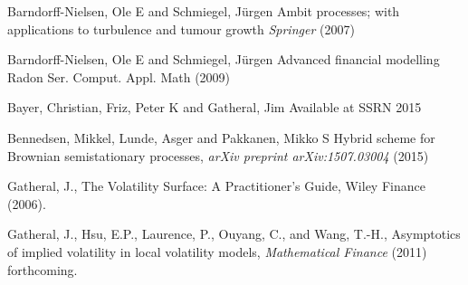 \documentclass[12pt]{article}
\numberwithin{equation}{section}
\begin{document}
%
%
%
%

\begin{thebibliography}{}

{Barndorff-Nielsen, Ole E} and {Schmiegel, J{\"u}rgen}
{Ambit processes; with applications to turbulence and tumour growth}
{\it Springer} (2007)

{Barndorff-Nielsen, Ole E} and {Schmiegel, J{\"u}rgen}
{Advanced financial modelling}
{Radon Ser. Comput. Appl. Math} (2009)

{Bayer, Christian}, {Friz, Peter K} and {Gatheral, Jim}
{Available at SSRN}
{2015}

{Bennedsen, Mikkel}, {Lunde, Asger} and {Pakkanen, Mikko S}
{Hybrid scheme for Brownian semistationary processes},
{\it arXiv preprint arXiv:1507.03004} (2015)

 { Gatheral, J.},
{The Volatility Surface: A Practitioner's Guide},
{Wiley Finance} (2006).

{ Gatheral, J.}, { Hsu, E.P.}, { Laurence, P.}, { Ouyang, C.}, and { Wang, T.-H.},
{Asymptotics of implied volatility in local volatility models},
{\it Mathematical Finance} (2011) forthcoming.

\end{thebibliography}
\end{document}
